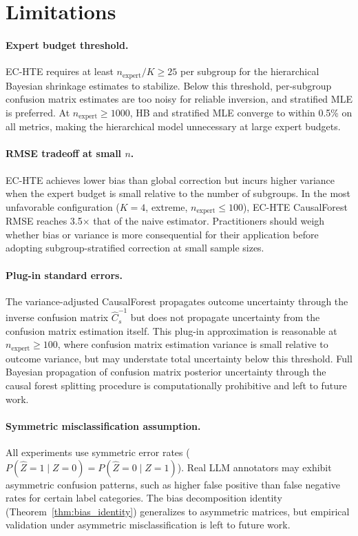 \section*{Limitations}

\paragraph{Expert budget threshold.}
EC-HTE requires at least $n_{\text{expert}} / K \geq 25$ per subgroup for the hierarchical Bayesian shrinkage estimates to stabilize.
Below this threshold, per-subgroup confusion matrix estimates are too noisy for reliable inversion, and stratified MLE is preferred.
At $n_{\text{expert}} \geq 1000$, HB and stratified MLE converge to within 0.5\% on all metrics, making the hierarchical model unnecessary at large expert budgets.

\paragraph{RMSE tradeoff at small $n$.}
EC-HTE achieves lower bias than global correction but incurs higher variance when the expert budget is small relative to the number of subgroups.
In the most unfavorable configuration ($K{=}4$, extreme, $n_{\text{expert}} \leq 100$), EC-HTE CausalForest RMSE reaches 3.5$\times$ that of the naive estimator.
Practitioners should weigh whether bias or variance is more consequential for their application before adopting subgroup-stratified correction at small sample sizes.

\paragraph{Plug-in standard errors.}
The variance-adjusted CausalForest propagates outcome uncertainty through the inverse confusion matrix $\hat{C}_s^{-1}$ but does not propagate uncertainty from the confusion matrix estimation itself.
This plug-in approximation is reasonable at $n_{\text{expert}} \geq 100$, where confusion matrix estimation variance is small relative to outcome variance, but may understate total uncertainty below this threshold.
Full Bayesian propagation of confusion matrix posterior uncertainty through the causal forest splitting procedure is computationally prohibitive and left to future work.

\paragraph{Symmetric misclassification assumption.}
All experiments use symmetric error rates ($P(\hat{Z}{=}1 \mid Z{=}0) = P(\hat{Z}{=}0 \mid Z{=}1)$).
Real LLM annotators may exhibit asymmetric confusion patterns, such as higher false positive than false negative rates for certain label categories.
The bias decomposition identity (Theorem~\ref{thm:bias_identity}) generalizes to asymmetric matrices, but empirical validation under asymmetric misclassification is left to future work.

